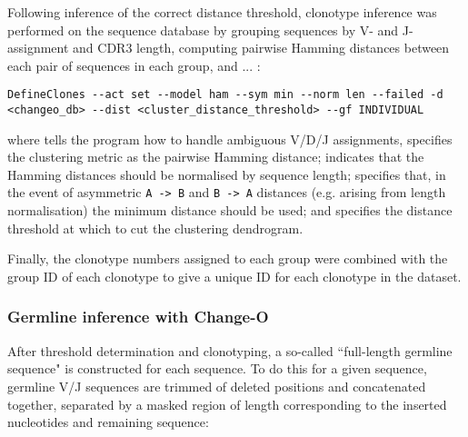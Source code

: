 Following inference of the correct distance threshold, clonotype inference was performed on the sequence database by grouping sequences by V- and J-assignment and CDR3 length, computing pairwise Hamming distances between each pair of sequences in each group, and ... : %


\begin{lstlisting}
DefineClones --act set --model ham --sym min --norm len --failed -d <changeo_db> --dist <cluster_distance_threshold> --gf INDIVIDUAL
\end{lstlisting}

\noindent where  tells the program how to handle ambiguous V/D/J assignments,  specifies the clustering metric as the pairwise Hamming distance;  indicates that the Hamming distances should be normalised by sequence length;  specifies that, in the event of asymmetric \texttt{A -> B} and \texttt{B -> A} distances (e.g. arising from length normalisation) the minimum distance should be used; and  specifies the distance threshold at which to cut the clustering dendrogram.

Finally, the clonotype numbers assigned to each group %
were combined with the group ID of each clonotype to give a unique ID for each clonotype in the dataset.

\subsubsection{Germline inference with Change-O}
\label{sec:methods_comp_igpreproc_clones}

After threshold determination and clonotyping, a so-called ``full-length germline sequence" is constructed for each sequence. To do this for a given sequence, germline V/J sequences are trimmed of deleted positions and concatenated together, separated by a masked region of length corresponding to the inserted nucleotides and remaining \dh sequence:

